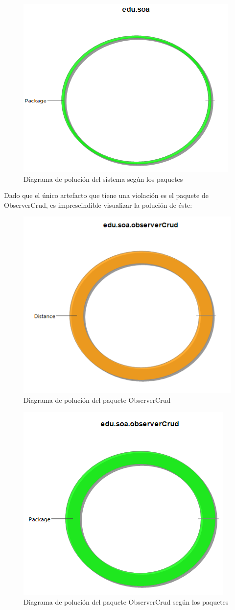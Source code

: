 \begin{figure}[H]
	\centering
	\includegraphics[width=0.6\linewidth]{parte2/imgs/Metricas/diagramaPolucionDominio}
	\caption{Diagrama de polución del sistema según los paquetes}
	\label{fig:polucionDominio}
\end{figure}

Dado que el único artefacto que tiene una violación es el paquete de ObserverCrud, es imprescindible visualizar la polución de éste:

\begin{figure}[H]
	\centering
	\includegraphics[width=0.6\linewidth]{parte2/imgs/Metricas/diagramaPolucionObserver}
	\caption{Diagrama de polución del paquete ObserverCrud}
	\label{fig:diagramapolucionobserver}
\end{figure}

\begin{figure}[H]
	\centering
	\includegraphics[width=0.6\linewidth]{parte2/imgs/Metricas/diagramaPolucionDominioObserver}
	\caption{Diagrama de polución del paquete ObserverCrud según los paquetes}
	\label{fig:diagramapoluciondominioobserver}
\end{figure}

